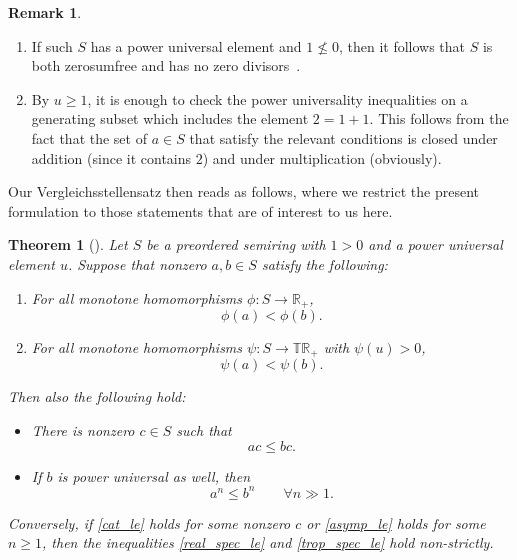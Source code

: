 \documentclass[11pt]{article}
\newtheorem{thm}[theo]{Theorem}
\theoremstyle{definition}
\newtheorem{rema}[theo]{Remark}
\numberwithin{equation}{section}
\newcommand{\R}{\mathbb{R}}
\newcommand{\TR}{\mathbb{TR}}
\begin{document}
\begin{rema}
	\label{pu_rem}
	\begin{enumerate}
		\item If such $S$ has a power universal element and $1 \not\le 0$, then it follows that $S$ is both zerosumfree and has no zero divisors~\cite[Remark~3.36]{vergleichsstellensatz}.
		\item By $u \ge 1$, it is enough to check the power universality inequalities on a generating subset which includes the element $2 = 1 + 1$.
			This follows from the fact that the set of $a \in S$ that satisfy the relevant conditions is closed under addition (since it contains $2$) and under multiplication (obviously).
	\end{enumerate}
\end{rema}

Our Vergleichsstellensatz then reads as follows, where we restrict the present formulation to those statements that are of interest to us here.

\begin{thm}[{\cite[Theorem~7.15]{vergleichsstellensatz}}]
	\label{vss}
	Let $S$ be a preordered semiring with $1 > 0$ and a power universal element $u$. Suppose that nonzero $a, b \in S$ satisfy the following:
	\begin{enumerate}
		\item\label{real_spec} For all monotone homomorphisms $\phi : S \to \R_+$,
			\begin{equation}
				\label{real_spec_le}
				\phi(a) < \phi(b).
			\end{equation}
		\item\label{trop_spec} For all monotone homomorphisms $\psi : S \to \TR_+$ with $\psi(u) > 0$,
			\begin{equation}
				\label{trop_spec_le}
				\psi(a) < \psi(b).
			\end{equation}
	\end{enumerate}
	Then also the following hold:
	\begin{itemize}
		\item There is nonzero $c \in S$ such that
			\begin{equation}
				\label{cat_le}
				a c \le b c.
			\end{equation}
		\item If $b$ is power universal as well, then
			\begin{equation}
				\label{asymp_le}
				a^n \le b^n \qquad \forall n \gg 1.
			\end{equation}
	\end{itemize}
	Conversely, if \eqref{cat_le} holds for some nonzero $c$ or \eqref{asymp_le} holds for some $n \ge 1$, then the inequalities \eqref{real_spec_le} and \eqref{trop_spec_le} hold non-strictly.
\end{thm}
\end{document}
